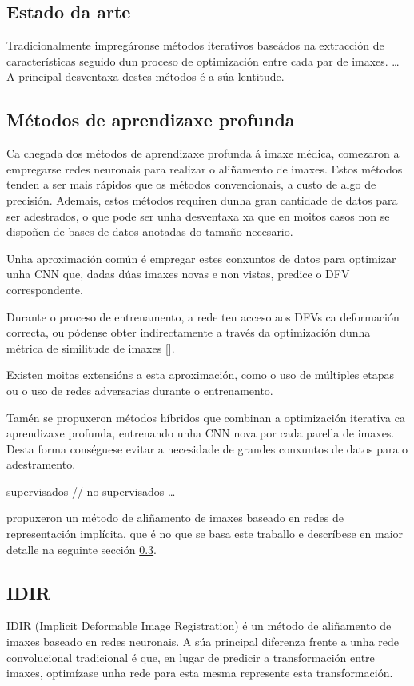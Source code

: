 \subsection{Estado da arte}
\label{subsec:Estado da arte}


Tradicionalmente impregáronse métodos iterativos baseádos na extracción de características 
seguido dun proceso de optimización entre cada par de imaxes. 
\dots
A principal desventaxa destes métodos é a súa lentitude.

\subsection{Métodos de aprendizaxe profunda}
\label{subsec:Métodos de aprendizaxe profunda}

Ca chegada dos métodos de aprendizaxe profunda á imaxe médica, comezaron a empregarse redes neuronais para realizar o aliñamento de imaxes.
Estos métodos tenden a ser mais rápidos que os métodos convencionais, a custo de algo de precisión. 
Ademais, estos métodos requiren dunha gran cantidade de datos para ser adestrados, 
o que pode ser unha desventaxa xa que en moitos casos non se dispoñen de bases de datos anotadas do tamaño necesario.

Unha aproximación común é empregar estes conxuntos de datos para optimizar unha CNN que,
 dadas dúas imaxes novas e non vistas, predice o DFV correspondente.

Durante o proceso de entrenamento, a rede ten acceso aos DFVs ca deformación correcta,
 ou pódense obter indirectamente a través da optimización dunha métrica de similitude de imaxes [].

Existen moitas extensións a esta aproximación, como o uso de múltiples etapas ou o uso de redes adversarias durante o entrenamento.

Tamén se propuxeron métodos híbridos que combinan a optimización iterativa ca aprendizaxe profunda, 
entrenando unha CNN nova por cada parella de imaxes. Desta forma conséguese evitar a necesidade de grandes conxuntos de datos para o adestramento.


supervisados // no supervisados
\dots

\cite{wolterink2021implicit} propuxeron un método de aliñamento de imaxes baseado en redes de representación implícita,
 que é no que se basa este traballo e descríbese en maior detalle na seguinte sección \ref{subsec:IDIR}.

\subsection{IDIR}
\label{subsec:IDIR}
IDIR (Implicit Deformable Image Registration) é un método de aliñamento de imaxes baseado en redes neuronais. 
A súa principal diferenza frente a unha rede convolucional tradicional é que, 
en lugar de predicir a transformación entre imaxes, optimízase unha rede para esta mesma represente esta transformación.


